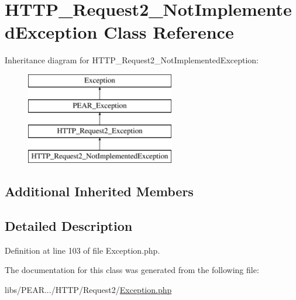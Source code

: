 \hypertarget{classHTTP__Request2__NotImplementedException}{}\section{H\+T\+T\+P\+\_\+\+Request2\+\_\+\+Not\+Implemented\+Exception Class Reference}
\label{classHTTP__Request2__NotImplementedException}
Inheritance diagram for H\+T\+T\+P\+\_\+\+Request2\+\_\+\+Not\+Implemented\+Exception\+:\begin{figure}[H]
\begin{center}
\leavevmode
\includegraphics[height=4.000000cm]{classHTTP__Request2__NotImplementedException}
\end{center}
\end{figure}
\subsection*{Additional Inherited Members}


\subsection{Detailed Description}


Definition at line 103 of file Exception.\+php.



The documentation for this class was generated from the following file\+:\begin{DoxyCompactItemize}
\item 
libs/\+P\+E\+A\+R.../\+H\+T\+T\+P/\+Request2/\hyperlink{HTTP_2Request2_2Exception_8php}{Exception.\+php}\end{DoxyCompactItemize}
